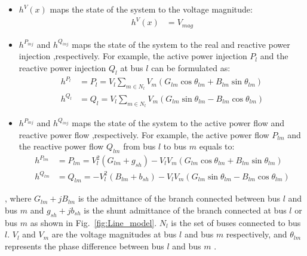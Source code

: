\begin{itemize}
    \item $h^V(x)$ maps the state of the system to the voltage magnitude:
    \begin{align}
        h^V(x) &= V_{mag}
    \end{align}
    \item $h^{P_{inj}}$ and $h^{Q_{inj}}$ maps the state of the system to the real and reactive power injection ,respectively. For example, the active power injection $P_l$ and the reactive power injection $Q_l$ at bus $l$ can be formulated as:
        \begin{align} 
    	    h^{P_{l}} &= P_{l} 
    	    = V_{l} \sum_{m \in N_l}V_{m} \left(G_{lm}\cos{\theta_{lm}} + B_{lm}\sin{\theta_{lm}} \right)
    	    \label{eq:Pinj} \\[1pt]
    	    h^{Q_{l}} &= Q_{l} = V_{l} \sum_{m \in N_l}V_{m} \left(G_{lm}\sin{\theta_{lm}} - B_{lm}\cos{\theta_{lm}} \right)
    	    \label{eq:Qinj}
        \end{align}
    \item $h^{P_{inj}}$ and $h^{Q_{inj}}$ maps the state of the system to the active power flow and reactive power flow ,respectively. For example, the active power flow $P_{lm}$ and the reactive power flow $Q_{lm}$ from bus $l$ to bus $m$ equals to:
        \begin{align} 
    	    h^{P_{lm}} &= P_{lm} = V_{l}^2 \left(G_{lm}+g_{sh} \right)-V_{l}V_{m}\left(G_{lm}\cos{\theta_{lm}} + B_{lm}\sin{\theta_{lm}} \right)
    	    \label{eq:flow_active} \\[1pt]
    	    h^{Q_{lm}} &= Q_{lm} = -V_{l}^2 \left(B_{lm}+b_{sh} \right)-V_{l}V_{m}\left(G_{lm}\sin{\theta_{lm}} - B_{lm}\cos{\theta_{lm}} \right)
    	    \label{eq:flow_reactive}
        \end{align}    
\end{itemize}
, where
$G_{lm} + jB_{lm}$ is the admittance of the branch connected between bus $l$ and bus $m$ and $g_{sh} + jb_{sh}$ is the shunt admittance of the branch connected at bus $l$ or bus $m$ as shown in Fig.~\ref{fig:Line_model}. $N_{l}$ is the set of buses connected to bus $l$. $V_l$ and $V_m$ are the voltage magnitudes at bus $l$ and bus $m$ respectively, and $\theta_{lm}$ represents the phase difference between bus $l$ and bus $m$ \cite{gomez2004power}. 
\bigskip
